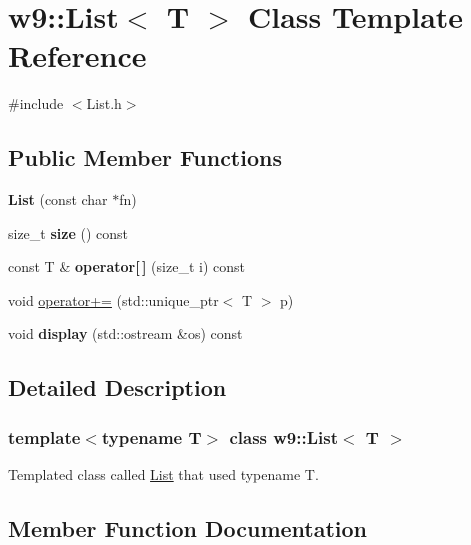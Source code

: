 \hypertarget{classw9_1_1List}{}\section{w9\+:\+:List$<$ T $>$ Class Template Reference}
\label{classw9_1_1List}


{\ttfamily \#include $<$List.\+h$>$}

\subsection*{Public Member Functions}
\begin{DoxyCompactItemize}
\item 
\mbox{\label{classw9_1_1List_a73fb7f5d57a77b9ca4999d45034261c5}} 
{\bfseries List} (const char $\ast$fn)
\item 
\mbox{\label{classw9_1_1List_a2f95349bb7dc66b699dc0785e74b4c3c}} 
size\+\_\+t {\bfseries size} () const
\item 
\mbox{\label{classw9_1_1List_a8b3cc4033e83a4714192349a1cfde9de}} 
const T \& {\bfseries operator\mbox{[}$\,$\mbox{]}} (size\+\_\+t i) const
\item 
void \mbox{\hyperlink{classw9_1_1List_a1bf4e702f53f727ec39dd7ced4fb850d}{operator+=}} (std\+::unique\+\_\+ptr$<$ T $>$ p)
\item 
\mbox{\label{classw9_1_1List_a5b6bd398763c766a1e3b60fcd821ec34}} 
void {\bfseries display} (std\+::ostream \&os) const
\end{DoxyCompactItemize}


\subsection{Detailed Description}
\subsubsection*{template$<$typename T$>$\newline
class w9\+::\+List$<$ T $>$}

Templated class called \mbox{\hyperlink{classw9_1_1List}{List}} that used typename T. 

\subsection{Member Function Documentation}
\mbox{\label{classw9_1_1List_a1bf4e702f53f727ec39dd7ced4fb850d}} 
